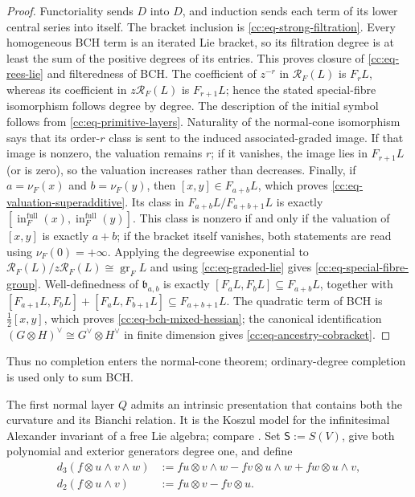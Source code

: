 \documentclass[10pt,reqno]{amsart}
\theoremstyle{plain}
\theoremstyle{definition}
\theoremstyle{remark}
\begin{document}
\begin{proof}
Functoriality sends \(D\) into \(D\), and induction sends each term of its
lower central series into itself.  The bracket inclusion is
\eqref{cc:eq-strong-filtration}.  Every homogeneous BCH term is an
iterated Lie bracket, so its filtration degree is at least the sum of the
positive degrees of its entries.  This proves closure of
\eqref{cc:eq-rees-lie} and filteredness of BCH\@.  The coefficient of
\(z^{-r}\) in \(\mathcal R_F(L)\) is \(F_rL\), whereas its coefficient
in \(z\mathcal R_F(L)\) is \(F_{r+1}L\); hence the stated special-fibre
isomorphism follows degree by degree.  The description of the
initial symbol follows from \eqref{cc:eq-primitive-layers}.  Naturality
of the normal-cone isomorphism says that its order-\(r\) class is sent to
the induced associated-graded image.  If that image is nonzero, the
valuation remains \(r\); if it vanishes, the image lies in
\(F_{r+1}L\) (or is zero), so the valuation increases rather than
decreases.  Finally, if \(a=\nu_F(x)\) and \(b=\nu_F(y)\), then
\([x,y]\in F_{a+b}L\), which proves
\eqref{cc:eq-valuation-superadditive}.  Its class in
\(F_{a+b}L/F_{a+b+1}L\) is exactly
\([\operatorname{in}_F^{\mathrm{full}}(x),
  \operatorname{in}_F^{\mathrm{full}}(y)]\).  This class is nonzero if
and only if the valuation of \([x,y]\) is exactly \(a+b\); if the bracket
itself vanishes, both statements are read using \(\nu_F(0)=+\infty\).
Applying the degreewise exponential to
\(\mathcal R_F(L)/z\mathcal R_F(L)\cong{\operatorname{gr}}_FL\) and using
\eqref{cc:eq-graded-lie} gives \eqref{cc:eq-special-fibre-group}.
Well-definedness of \(\mathfrak b_{a,b}\) is exactly
\([F_aL,F_bL]\subseteq F_{a+b}L\), together with
\([F_{a+1}L,F_bL]+[F_aL,F_{b+1}L]\subseteq F_{a+b+1}L\).
The quadratic term of BCH is \(\frac12[x,y]\), which proves
\eqref{cc:eq-bch-mixed-hessian}; the canonical identification
\((G\otimes H)^\vee\cong G^\vee\otimes H^\vee\) in finite dimension gives
\eqref{cc:eq-ancestry-cobracket}.
\end{proof}

Thus no completion enters the normal-cone theorem; ordinary-degree
completion is used only to sum BCH.

The first normal layer \(Q\) admits an intrinsic presentation that contains
both the curvature and its Bianchi relation.  It is the Koszul model for
the infinitesimal Alexander invariant of a free Lie algebra; compare
\cite[Thm.~6.2]{PapadimaSuciu04}.  Set \(\mathsf S:=S(V)\), give
both polynomial and exterior generators degree one, and define
\begin{align}
 d_3(f\otimes u\wedge v\wedge w)
 &:=fu\otimes v\wedge w-fv\otimes u\wedge w
      +fw\otimes u\wedge v,                                    
 \label{cc:eq-d3}\\
 d_2(f\otimes u\wedge v)&:=fu\otimes v-fv\otimes u.
 \label{cc:eq-d2}
\end{align}
\end{document}

